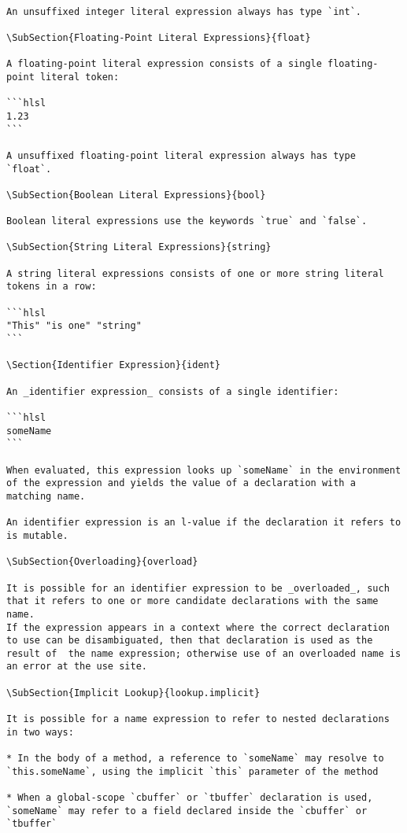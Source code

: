 \begin{verbatim}

An unsuffixed integer literal expression always has type `int`.

\SubSection{Floating-Point Literal Expressions}{float}

A floating-point literal expression consists of a single floating-point literal token:

```hlsl
1.23
```

A unsuffixed floating-point literal expression always has type `float`.

\SubSection{Boolean Literal Expressions}{bool}

Boolean literal expressions use the keywords `true` and `false`.

\SubSection{String Literal Expressions}{string}

A string literal expressions consists of one or more string literal tokens in a row:

```hlsl
"This" "is one" "string"
```

\Section{Identifier Expression}{ident}

An _identifier expression_ consists of a single identifier:

```hlsl
someName
```

When evaluated, this expression looks up `someName` in the environment of the expression and yields the value of a declaration with a matching name.

An identifier expression is an l-value if the declaration it refers to is mutable.

\SubSection{Overloading}{overload}

It is possible for an identifier expression to be _overloaded_, such that it refers to one or more candidate declarations with the same name.
If the expression appears in a context where the correct declaration to use can be disambiguated, then that declaration is used as the result of  the name expression; otherwise use of an overloaded name is an error at the use site.

\SubSection{Implicit Lookup}{lookup.implicit}

It is possible for a name expression to refer to nested declarations in two ways:

* In the body of a method, a reference to `someName` may resolve to `this.someName`, using the implicit `this` parameter of the method

* When a global-scope `cbuffer` or `tbuffer` declaration is used, `someName` may refer to a field declared inside the `cbuffer` or `tbuffer`


\end{verbatim}
